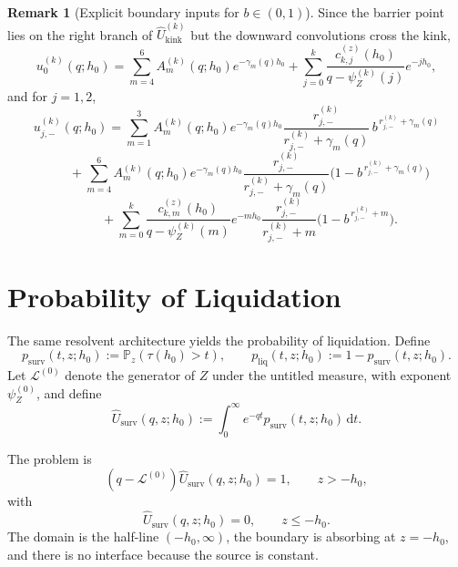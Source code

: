 \documentclass{article}
\renewcommand{\P}{\mathbb{P}}
\newcommand{\diff}{\mathrm{d}}
\theoremstyle{definition}
\newtheorem{remark}{Remark}[section]
\begin{document}
\begin{remark}[Explicit boundary inputs for $b\in(0,1)$]
Since the barrier point lies on the right branch of $\widehat U_{\mathrm{kink}}^{(k)}$ but the downward convolutions
cross the kink,
\[
u_0^{(k)}(q;h_0)
=
\sum_{m=4}^6 A_m^{(k)}(q;h_0)e^{-\gamma_m(q)h_0}
+
\sum_{j=0}^{k}\frac{c_{k,j}^{(z)}(h_0)}{q-\psi_Z^{(k)}(j)}e^{-jh_0},
\]
and for $j=1,2$,
\[
u_{j,-}^{(k)}(q;h_0)
=
\sum_{m=1}^3
A_m^{(k)}(q;h_0)e^{-\gamma_m(q)h_0}
\frac{r_{j,-}^{(k)}}{r_{j,-}^{(k)}+\gamma_m(q)}
\,b^{\,r_{j,-}^{(k)}+\gamma_m(q)}
\]
\[
\qquad
+\sum_{m=4}^6
A_m^{(k)}(q;h_0)e^{-\gamma_m(q)h_0}
\frac{r_{j,-}^{(k)}}{r_{j,-}^{(k)}+\gamma_m(q)}
\Big(1-b^{\,r_{j,-}^{(k)}+\gamma_m(q)}\Big)
\]
\[
\qquad
+\sum_{m=0}^{k}
\frac{c_{k,m}^{(z)}(h_0)}{q-\psi_Z^{(k)}(m)}e^{-mh_0}
\frac{r_{j,-}^{(k)}}{r_{j,-}^{(k)}+m}
\Big(1-b^{\,r_{j,-}^{(k)}+m}\Big).
\]
\end{remark}

\section{Probability of Liquidation}

The same resolvent architecture yields the probability of liquidation. Define
\[
p_{\mathrm{surv}}(t,z;h_0):=\P_z(\tau(h_0)>t),
\qquad
p_{\mathrm{liq}}(t,z;h_0):=1-p_{\mathrm{surv}}(t,z;h_0).
\]
Let $\mathcal L^{(0)}$ denote the generator of $Z$ under the untitled measure, with exponent $\psi_Z^{(0)}$, and define
\[
\widehat U_{\mathrm{surv}}(q,z;h_0)
:=
\int_0^\infty e^{-qt}p_{\mathrm{surv}}(t,z;h_0)\,\diff t.
\]

The problem is
\[
(q-\mathcal L^{(0)})\widehat U_{\mathrm{surv}}(q,z;h_0)=1,
\qquad z>-h_0,
\]
with
\[
\widehat U_{\mathrm{surv}}(q,z;h_0)=0,\qquad z\le -h_0.
\]
The domain is the half-line $(-h_0,\infty)$, the boundary is absorbing at $z=-h_0$, and there is no interface because
the source is constant.
\end{document}

